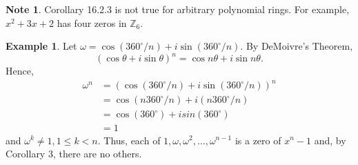 \documentclass{article}
\newtheorem{theorem}{Theorem}[section]
\theoremstyle{definition}
\newtheorem{definition}{Definition}[section]
\newtheorem{example}{Example}[section]
\newtheorem{note}{Note}[section]
\begin{document}
\begin{note}
    Corollary 16.2.3 is not true for arbitrary polynomial rings. For example, $x^2+3x+2$ has four zeros in $\mathbb{Z}_6$. 
\end{note}

\begin{example}
    Let $\omega=\cos(360^\circ /n)+i\sin(360^\circ /n)$. By DeMoivre's Theorem,
    \begin{equation*}
        (\cos\theta+i\sin\theta)^n=\cos n\theta+i\sin n\theta.
    \end{equation*}
    Hence,
    \begin{align*}
        \omega^n&=(\cos(360^\circ /n)+i\sin(360^\circ /n))^n \\
        &= \cos(n360^\circ/n)+i(n360^\circ/n) \\
        &= \cos(360^\circ)+isin(360^\circ) \\
        &= 1
    \end{align*}
    and $\omega^k\neq1, 1\leq k< n$. Thus, each of $1, \omega, \omega^2, \dots, \omega^{n-1}$ is a zero of $x^n-1$ and, by Corollary 3, there are no others.
\end{example}

\noindent{}

\noindent{}
\end{document}
